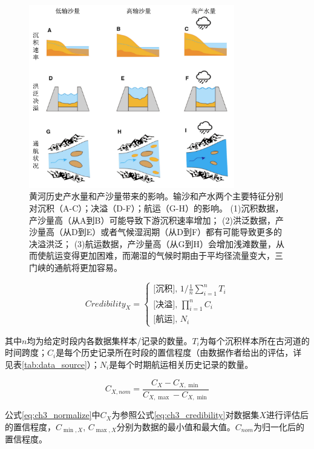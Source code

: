 \begin{figure}[htb] %
    \centering
    \includegraphics[width=0.8\textwidth]{img/ch3/ch3_impacts_diagram.png}
    \caption[黄河历史产水量和产沙量变化的影响]{黄河历史产水量和产沙量带来的影响。输沙和产水两个主要特征分别对沉积（A-C）；决溢（D-F）；航运（G-H）的影响。
    (1)沉积数据，产沙量高（从A到B）可能导致下游沉积速率增加\cite{xu2003a,yeqingchao1994}；
    (2)洪泛数据，产沙量高（从D到E）或者气候湿润期（从D到F）都有可能导致更多的决溢洪泛\cite{chen2012}；
    (3)航运数据，产沙量高（从G到H）会增加浅滩数量，从而使航运变得更加困难，而潮湿的气候时期由于平均径流量变大，三门峡的通航将更加容易\cite{WangShouChun1993}。}\label{fig:ch3:impacts_diagram}
\end{figure}



\begin{equation}
    \label{eq:ch3_credibility}
    Credibility_X = 
    \left\{\begin{array}{l}
        \text{[沉积], } 1 / \frac{1}{n} \sum_{i=1}^n T_i\\
        \text{[决溢], } \prod_{i=1}^n C_i\\
        \text{[航运], } N_i
    \end{array}\right.
\end{equation}    

其中$n$均为给定时段内各数据集样本/记录的数量。$T_i$为每个沉积样本所在古河道的时间跨度；$C_i$是每个历史记录所在时段的置信程度（由数据作者给出的评估，详见表\ref{tab:data_source}）；$N_i$是每个时期航运相关历史记录的数量。

\begin{equation}
    \label{eq:ch3_normalize}
    C_{X, nom}=\frac{C_X-C_{X, \min}}{C_{X, \max}-C_{X, \min}}
\end{equation}

公式\ref{eq:ch3_normalize}中$C_{X}$为参照公式\ref{eq:ch3_credibility}对数据集$X$进行评估后的置信程度，$C_{\min, X}$, $C_{\max, X}$分别为数据的最小值和最大值。$C_{nom}$为归一化后的置信程度。

